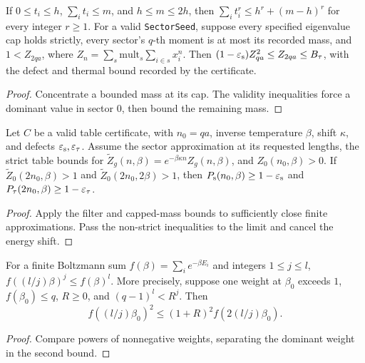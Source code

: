 \begin{lemma}
  \label{lem:seed-capped}
  \leanok
  If \(0\le t_i\le h\), \(\sum_i t_i\le m\), and \(h\le m\le2h\), then
  \(\sum_i t_i^r\le h^r+(m-h)^r\) for every integer \(r\ge1\).
  For a valid \texttt{SectorSeed}, suppose every specified eigenvalue cap holds strictly,
  every sector's \(q\)-th moment is at most its recorded mass, and
  \(1<Z_{2qa}\), where \(Z_n=\sum_s\mathrm{mult}_s\sum_{i\in s}x_i^n\).
  Then
  \((1-\varepsilon_{\mathrm{s}})Z_{qa}^2\le Z_{2qa}\le B_\tau\), with the defect and thermal bound recorded
  by the certificate.
\end{lemma}
\begin{proof}
  \leanok
  Concentrate a bounded mass at its cap. The validity inequalities force a dominant value
  in sector \(0\), then bound the remaining mass.
\end{proof}

\begin{theorem}
  \label{thm:seed-table}
  \leanok
  Let \(C\) be a valid table certificate, with \(n_0=qa\), inverse temperature \(\beta\),
  shift \(\kappa\), and defects \(\varepsilon_{\mathrm{s}},\varepsilon_{\tau}\). Assume the sector approximation at its requested
  lengths, the strict table bounds for
  \(\widetilde Z_g(n,\beta)=e^{-\beta\kappa n}Z_g(n,\beta)\), and \(Z_0(n_0,\beta)>0\).
  If \(\widetilde Z_0(2n_0,\beta)>1\) and
  \(\widetilde Z_0(2n_0,2\beta)>1\), then
  \(P_{\mathrm{s}}(n_0,\beta)\ge1-\varepsilon_{\mathrm{s}}\) and \(P_{\tau}(2n_0,\beta)\ge1-\varepsilon_{\tau}\).
\end{theorem}
\begin{proof}
  \leanok
  Apply the filter and capped-mass bounds to sufficiently close finite approximations.
  Pass the non-strict inequalities to the limit and cancel the energy shift.
\end{proof}

\begin{lemma}
  \label{lem:seed-temperature-lift}
  \leanok
  For a finite Boltzmann sum \(f(\beta)=\sum_i e^{-\beta E_i}\) and integers \(1\le j\le l\),
  \(f((l/j)\beta)^j\le f(\beta)^l\).
  More precisely, suppose one weight at \(\beta_0\) exceeds \(1\),
  \(f(\beta_0)\le q\), \(R\ge0\), and \((q-1)^l<R^j\). Then
  \[
    f((l/j)\beta_0)^2\le(1+R)^2 f(2(l/j)\beta_0).
  \]
\end{lemma}
\begin{proof}
  \leanok
  Compare powers of nonnegative weights, separating the dominant weight in the second bound.
\end{proof}

